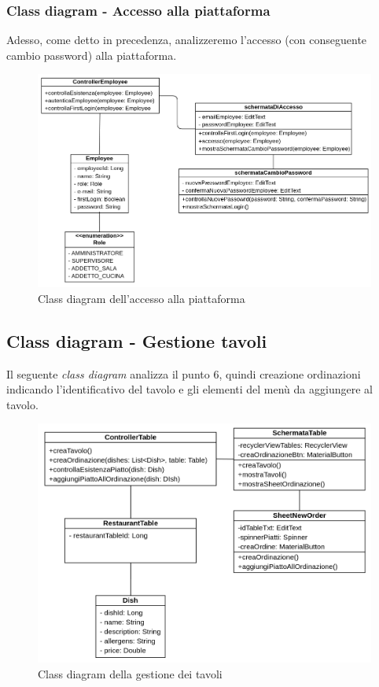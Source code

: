 \subsubsection{Class diagram - Accesso alla piattaforma}
Adesso, come detto in precedenza, analizzeremo l'accesso (con conseguente cambio password) alla piattaforma.
\begin{figure}[H]
  \centering
  \includegraphics[scale=0.5]{img/class_diagrams/accessoCambioPassword_class_diagram.png}
  \caption{Class diagram dell'accesso alla piattaforma}
\end{figure}
\subsection{Class diagram - Gestione tavoli}
Il seguente \textit{class diagram} analizza il punto 6, quindi creazione ordinazioni indicando l'identificativo del tavolo e gli elementi del menù da aggiungere al tavolo.
\begin{figure}[H]
  \centering
  \includegraphics[scale=0.5]{img/class_diagrams/gestioneTavoli_class_diagram.png}
  \caption{Class diagram della gestione dei tavoli}
\end{figure}
\newpage
